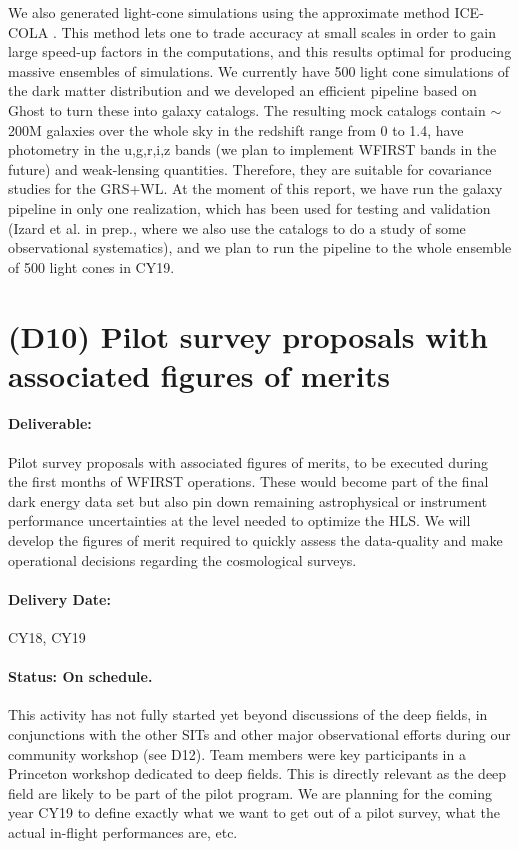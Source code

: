 We also generated light-cone simulations using the approximate method ICE-COLA \citep{Izard2016,Izard2018}. This method lets one to trade accuracy at small scales in order to gain large speed-up factors in the computations, and this results optimal for producing massive ensembles of simulations. We currently have 500 light cone simulations of the dark matter distribution and we developed an efficient pipeline based on Ghost \citep{Bull2017} to turn these into galaxy catalogs. The resulting mock catalogs contain $\sim$ 200M galaxies over the whole sky in the redshift range from 0 to 1.4, have photometry in the u,g,r,i,z  bands (we plan to implement WFIRST bands in the future) and weak-lensing quantities. Therefore, they are suitable for covariance studies for the GRS+WL. At the moment of this report, we have run the galaxy pipeline in only one realization, which has been used for testing and validation (Izard et al. in prep., where we also use the catalogs to do a study of some observational systematics), and we plan to run the pipeline to the whole ensemble of 500 light cones in CY19.

\section*{(D10) Pilot survey proposals with associated figures of merits}

\paragraph*{Deliverable:} Pilot survey proposals with associated figures of merits, to be executed during the first months of WFIRST operations. These would become
part of the final dark energy data set but also pin down remaining astrophysical
or instrument performance uncertainties at the level needed to optimize the HLS.
We will develop the figures of merit required to quickly assess the data-quality
and make operational decisions regarding the cosmological surveys.

\paragraph*{Delivery Date:} CY18, CY19

\paragraph*{Status: On schedule.} This activity has not fully started yet beyond discussions of the deep fields, in conjunctions with the other SITs and other major observational efforts during our community workshop (see D12). Team members were key participants in a Princeton workshop dedicated to deep fields. This is directly relevant as the deep field are likely to be part of the pilot program. We are planning for the coming year CY19 to define exactly what we want to get out of a pilot survey, what the actual in-flight performances are, etc.


